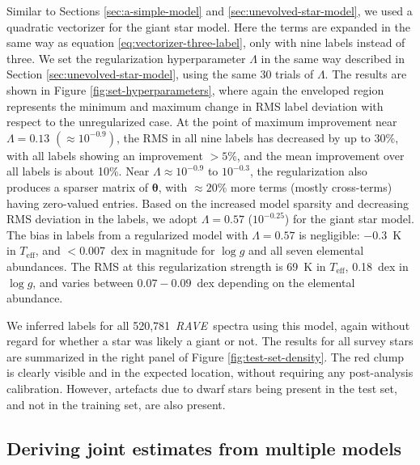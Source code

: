 \documentclass[preprint]{aastex61}
\newcommand{\acronym}[1]{{\small{#1}}}
\newcommand{\project}[1]{\textsl{#1}}
\newcommand{\rave}{\project{\acronym{RAVE}}}
\newcommand{\teff}{T_{\mathrm{eff}}}
\newcommand{\logg}{\log g}
\newcommand{\Nspectra}{520,781}
\newcommand{\Dvector}[1]{\boldsymbol{#1}}
\newcommand{\vectheta}{\Dvector{\theta}}
\begin{document}
Similar to Sections \ref{sec:a-simple-model} and \ref{sec:unevolved-star-model},
we used a quadratic vectorizer for the giant star model.  Here the terms are 
expanded in the same way as equation \ref{eq:vectorizer-three-label}, only
with nine labels instead of three.  We set the regularization hyperparameter $\Lambda$
in the same way described in Section \ref{sec:unevolved-star-model}, using the same 30 trials of $\Lambda$.
The results are shown in Figure \ref{fig:set-hyperparameters}, where
again the enveloped region represents the minimum and maximum change in RMS label
deviation with respect to the unregularized case.  At the point of maximum improvement 
near $\Lambda = 0.13$ $(\approx10^{-0.9})$, the RMS in all nine labels has decreased by up to $30$\%,
with all labels showing an improvement $>5$\%, and the mean improvement over all labels is about 10\%.
Near $\Lambda \approx 10^{-0.9}$ to $10^{-0.3}$, the regularization also produces a sparser matrix
of $\vectheta$, with $\approx20$\% more terms (mostly cross-terms) having zero-valued entries.
Based on the increased model sparsity and decreasing RMS deviation in the labels, 
we adopt $\Lambda = 0.57$ ($10^{-0.25}$) for the giant star model.  The bias in 
labels from a regularized model with $\Lambda = 0.57$ is negligible: $-0.3$~K in 
$\teff$, and $<$0.007~dex in magnitude for $\logg$ and all seven elemental
abundances.  The RMS at this regularization strength is 69~K in $\teff$, 0.18~dex 
in $\logg$, and varies between $0.07-0.09$~dex depending on the elemental abundance.  


We inferred labels for all \Nspectra\ \rave\ spectra using this model, again without
regard for whether a star was likely a giant or not.  The results for all survey stars
are summarized in the right panel of Figure \ref{fig:test-set-density}.  The red clump
is clearly visible and in the expected location, without requiring any post-analysis 
calibration.  However, artefacts due to dwarf stars being present in the test set,
and not in the training set, are also present.


\subsection{Deriving joint estimates from multiple models}
\label{sec:joining-the-models}
\end{document}
